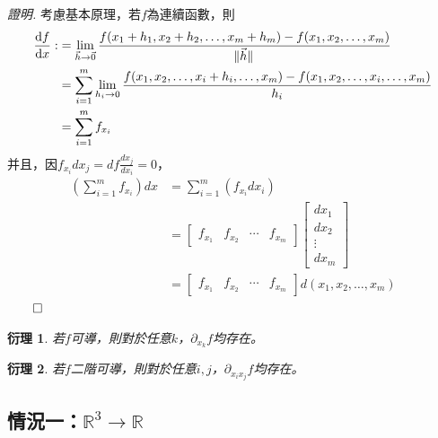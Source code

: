 \documentclass[12pt]{article}
\newtheorem*{corollary}{衍理}
\renewenvironment*{proof}{\textit{證明.}}{\hfill$\qed$}
\begin{document}
    \begin{proof}
        考慮基本原理，若$f$為連續函數，則\begin{align*}
            \derivative{f}{x}:&=\lim_{\vec{h}\to\vec{0}}\frac{f(x_1+h_1,x_2+h_2,\dots,x_m+h_m)-f(x_1,x_2,\dots,x_m)}{\norm*{\vec{h}}}\\
            &=\sum_{i=1}^{m}\lim_{h_i\to 0}\frac{f(x_1,x_2,\dots,x_i+h_i,\dots,x_m)-f(x_1,x_2,\dots,x_i,\dots,x_m)}{h_i}\\
            &=\sum_{i=1}^{m}f_{x_i}
        \end{align*}
        并且，因$f_{x_i} dx_j=df\frac{dx_j}{dx_i}=0$，\begin{align*}
            (\sum_{i=1}^{m}f_{x_i})dx&=\sum_{i=1}^{m}(f_{x_i} dx_i)\\
            &=\begin{bmatrix}
                f_{x_1}&f_{x_2}&\cdots&f_{x_m}
            \end{bmatrix}\begin{bmatrix}
                dx_1\\dx_2\\\vdots\\dx_m
            \end{bmatrix}\\
            &=\begin{bmatrix}
                f_{x_1}&f_{x_2}&\cdots&f_{x_m}
            \end{bmatrix}d(x_1,x_2,\dots,x_m)
        \end{align*}
    \end{proof}

    \begin{corollary}
        若$f$可導，則對於任意$k$，$\partial_{x_k} f$均存在。
    \end{corollary}

    \begin{corollary}
        若$f$二階可導，則對於任意$i,j$，$\partial_{x_i x_j} f$均存在。
    \end{corollary}

    \subsection*{情況一：$\mathbb{R}^3\to\mathbb{R}$}
\end{document}
